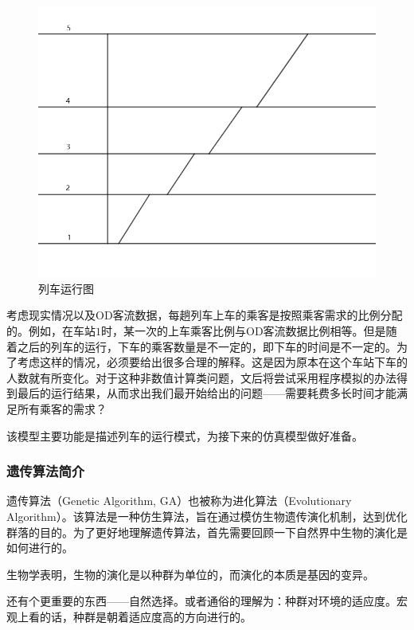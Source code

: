 \begin{figure}[h]
    \centering
    \includegraphics[scale=0.3]{res/figure160314.png}
    \caption{列车运行图}
\end{figure}

考虑现实情况以及OD客流数据，每趟列车上车的乘客是按照乘客需求的比例分配的。例如，在车站$1$时，某一次的上车乘客比例与OD客流数据比例相等。但是随着之后的列车的运行，下车的乘客数量是不一定的，即下车的时间是不一定的。为了考虑这样的情况，必须要给出很多合理的解释。这是因为原本在这个车站下车的人数就有所变化。对于这种非数值计算类问题，文后将尝试采用程序模拟的办法得到最后的运行结果，从而求出我们最开始给出的问题——需要耗费多长时间才能满足所有乘客的需求？

该模型主要功能是描述列车的运行模式，为接下来的仿真模型做好准备。

\subsubsection{遗传算法简介}

遗传算法（Genetic Algorithm, GA）也被称为进化算法（Evolutionary Algorithm）。该算法是一种仿生算法，旨在通过模仿生物遗传演化机制，达到优化群落的目的\cite{hanJiyuyichuanheshengsuanfaqiujiehanshuyouhuawenti2010}。为了更好地理解遗传算法，首先需要回顾一下自然界中生物的演化是如何进行的。

生物学表明，生物的演化是以种群为单位的，而演化的本质是基因的变异。

还有个更重要的东西——自然选择。或者通俗的理解为：种群对环境的适应度。宏观上看的话，种群是朝着适应度高的方向进行的。

